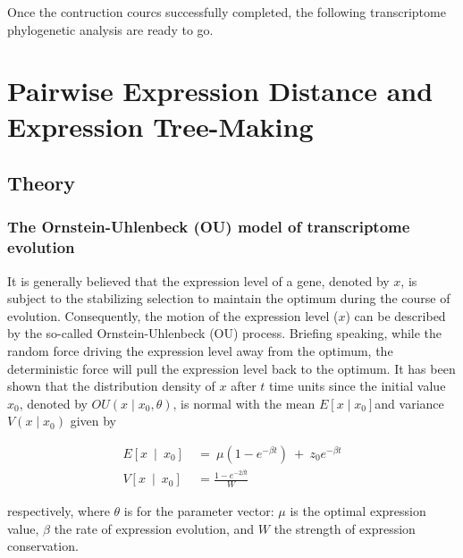 \documentclass[]{book}
\begin{document}
Once the contruction courcs successfully completed, the following transcriptome phylogenetic analysis are ready to go.

\hypertarget{pairwise-expression-distance-and-expression-tree-making}{%
\chapter{Pairwise Expression Distance and Expression Tree-Making}\label{pairwise-expression-distance-and-expression-tree-making}}

\hypertarget{theory}{%
\section{Theory}\label{theory}}

\hypertarget{the-ornstein-uhlenbeck-ou-model-of-transcriptome-evolution}{%
\subsection{The Ornstein-Uhlenbeck (OU) model of transcriptome evolution}\label{the-ornstein-uhlenbeck-ou-model-of-transcriptome-evolution}}

It is generally believed that the expression level of a gene, denoted by \(x\), is subject to the stabilizing selection to maintain the optimum during the course of evolution. Consequently, the motion of the expression level (\(x\)) can be described by the so-called Ornstein-Uhlenbeck (OU) process\citep[\citet{bergmann2004}\citet{butler2004}]{hansen1996}. Briefing speaking, while the random force driving the expression level away from the optimum, the deterministic force will pull the expression level back to the optimum. It has been shown that the distribution density of \(x\) after \(t\) time units since the initial value \(x_0\), denoted by \(OU\left(x\mid x_0,\theta\right)\), is normal with the mean \(E\left[x\mid x_0\right]\)and variance \(V\left(x\mid x_0\right)\) given by

\[
\begin{split}
E\left[x\  \mid\  x_0\right]\  &=\  \mu\left(1-e^{-\beta t}\right)\  +\  z_0e^{-\beta t} \\
V\left[x\  \mid\  x_0\right]\  &=\frac{1-e^{-2\beta t}}{W}
\end{split}\tag{1.1}
\]

respectively, where \(\theta\) is for the parameter vector: \(\mu\) is the optimal expression value, \(\beta\) the rate of expression evolution, and \(W\) the strength of expression conservation.
\end{document}
